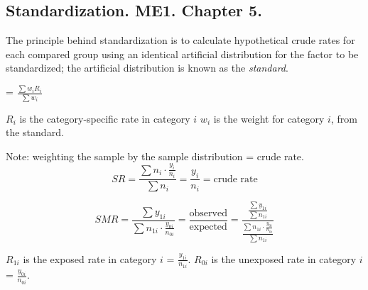 \documentclass[landscape]{article}
\newcommand{\squeezeup}{\vspace{-5mm}}
\newcommand{\squeezeupp}{\vspace{-2mm}}
\begin{document}


\footnotesize{} %
\begin{multicols}{3} %

\section{Standardization. ME1. Chapter 5.}%
\squeezeupp{}
\begin{tiny} The principle behind standardization is to calculate hypothetical crude rates for each compared group using an identical artificial distribution for the factor to be standardized; the artificial distribution is known as the \textit{standard}.
\end{tiny}

	\begin{description}

			\item[Standardized rate (SR)]
			= $\frac{\displaystyle \sum{w_{i}R_{i}}}{\displaystyle \sum{w_{i}}}$

			$R_{i}$ is the category-specific rate in category $i$
			$w_{i}$ is the weight for category $i$, from the standard.

			Note: weighting the sample by the sample distribution = crude rate.
			\squeezeupp{}
			\[ 
				SR = \frac{\displaystyle \sum{n_{i}\cdotp\frac{\displaystyle y_{i}}{\displaystyle n_{i}}}}{\displaystyle \sum{n_{i}}} = \frac{y_{i}}{n_{i}} = \textrm{crude rate}
			\]

			\item[Indirect]
			\squeezeup{}
			\squeezeup{}
				\[
				SMR = \frac{\sum{y_{1i}}}{\displaystyle \sum{n_{1i}\cdotp \frac{y_{0i}}{n_{0i}}}} = 
							\frac{\textrm{observed}}{\textrm{expected}} = 
							\frac	{
										\frac{\displaystyle \sum{y_{1i}}}
													{\sum{n_{1i}}} }
										 {
										\frac{{\displaystyle \sum{n_{1i}\cdotp \frac{y_{0i}}{n_{0i}}}}}
													{\displaystyle \sum{n_{1i}}}
										}
				\]

			$R_{1i}$ is the exposed rate in category $i$ = $\frac{y_{1i}}{n_{1i}}$.
			$R_{0i}$ is the unexposed rate in category $i$ = $\frac{y_{0i}}{n_{0i}}$.



\end{description}
\end{multicols}
\end{document}
